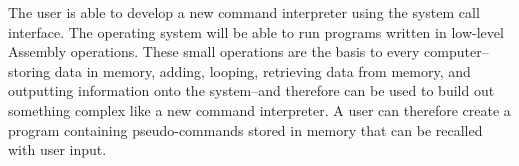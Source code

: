 \documentclass[letterpaper, 10pt,DIV=13]{scrartcl}
\begin{document}
The user is able to develop a new command interpreter using the system call interface. The operating system will be able to run programs written in low-level Assembly operations. These small operations are the basis to every computer--storing data in memory, adding, looping, retrieving data from memory, and outputting information onto the system--and therefore can be used to build out something complex like a new command interpreter. A user can therefore create a program containing pseudo-commands stored in memory that can be recalled with user input.
\end{document}
